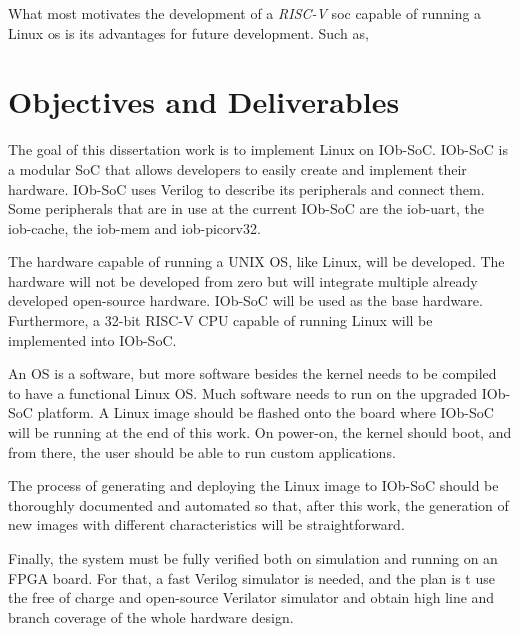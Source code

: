 What most motivates the development of a \textit{RISC-V} \acrshort{soc} capable of running a Linux \acrshort{os} is its advantages for future development. Such as,

\section{Objectives and Deliverables}
\label{section:objectives}
The goal of this dissertation work is to implement Linux on IOb-SoC. IOb-SoC is a modular SoC that allows developers to easily create and implement their hardware. IOb-SoC uses Verilog to describe its peripherals and connect them. Some peripherals that are in use at the current IOb-SoC are the iob-uart, the iob-cache, the iob-mem and iob-picorv32.

The hardware capable of running a UNIX OS, like Linux, will be developed. The hardware will not be developed from zero but will integrate multiple already developed open-source hardware. IOb-SoC will be used as the base hardware. Furthermore, a 32-bit RISC-V CPU capable of running Linux will be implemented into IOb-SoC.

An OS is a software, but more software besides the kernel needs to be compiled to have a functional Linux OS. Much software needs to run on the upgraded IOb-SoC platform. A Linux image should be flashed onto the board where IOb-SoC will be running at the end of this work. On power-on, the kernel should boot, and from there, the user should be able to run custom applications. 

The process of generating and deploying the Linux image to IOb-SoC should be thoroughly documented and automated so that, after this work, the generation of new images with different characteristics will be straightforward.

Finally, the system must be fully verified both on simulation and running on an FPGA board. For that, a fast Verilog simulator is needed, and the plan is t use the free of charge and open-source Verilator simulator and obtain high line and branch coverage of the whole hardware design.

